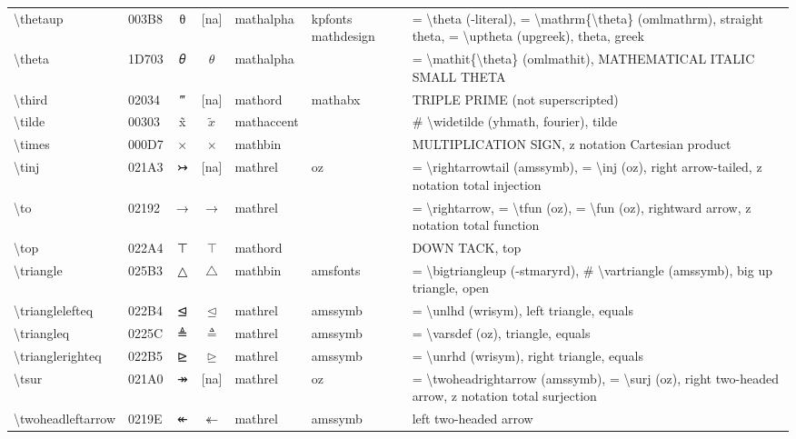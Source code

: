 \documentclass[a4paper,landscape]{article}
\begin{document}
\begin{longtable}{llcclll}
\textbackslash{}thetaup & 003B8 & θ & [na] & mathalpha & kpfonts mathdesign & = \textbackslash{}theta (-literal), = \textbackslash{}mathrm\{\textbackslash{}theta\} (omlmathrm),  straight theta,  = \textbackslash{}uptheta (upgreek),  theta,  greek \\
\textbackslash{}theta & 1D703 & 𝜃 & $\theta$ & mathalpha &  & = \textbackslash{}mathit\{\textbackslash{}theta\} (omlmathit), MATHEMATICAL ITALIC SMALL THETA \\
\textbackslash{}third & 02034 & ‴ & [na] & mathord & mathabx & TRIPLE PRIME (not superscripted) \\
\textbackslash{}tilde & 00303 & x̃ & $\tilde{x}$ & mathaccent &  & \# \textbackslash{}widetilde (yhmath, fourier), tilde \\
\textbackslash{}times & 000D7 & × & $\times$ & mathbin &  & MULTIPLICATION SIGN, z notation Cartesian product \\
\textbackslash{}tinj & 021A3 & ↣ & [na] & mathrel & oz & = \textbackslash{}rightarrowtail (amssymb),  = \textbackslash{}inj (oz),  right arrow-tailed,  z notation total injection \\
\textbackslash{}to & 02192 & → & $\to$ & mathrel &  & = \textbackslash{}rightarrow,  = \textbackslash{}tfun (oz),  = \textbackslash{}fun (oz),  rightward arrow,  z notation total function \\
\textbackslash{}top & 022A4 & ⊤ & $\top$ & mathord &  & DOWN TACK, top \\
\textbackslash{}triangle & 025B3 & △ & $\triangle$ & mathbin & amsfonts & = \textbackslash{}bigtriangleup (-stmaryrd),  \# \textbackslash{}vartriangle (amssymb),  big up triangle,  open \\
\textbackslash{}trianglelefteq & 022B4 & ⊴ & $\trianglelefteq$ & mathrel & amssymb & = \textbackslash{}unlhd (wrisym), left triangle, equals \\
\textbackslash{}triangleq & 0225C & ≜ & $\triangleq$ & mathrel & amssymb & = \textbackslash{}varsdef (oz), triangle, equals \\
\textbackslash{}trianglerighteq & 022B5 & ⊵ & $\trianglerighteq$ & mathrel & amssymb & = \textbackslash{}unrhd (wrisym), right triangle, equals \\
\textbackslash{}tsur & 021A0 & ↠ & [na] & mathrel & oz & = \textbackslash{}twoheadrightarrow (amssymb),  = \textbackslash{}surj (oz),  right two-headed arrow,  z notation total surjection \\
\textbackslash{}twoheadleftarrow & 0219E & ↞ & $\twoheadleftarrow$ & mathrel & amssymb & left two-headed arrow \\

\end{longtable}
\end{document}
